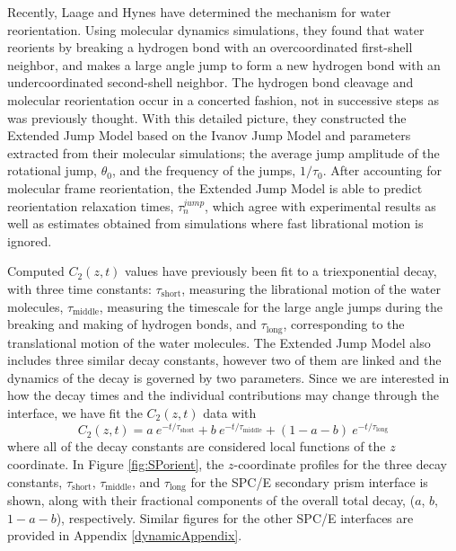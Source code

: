 Recently, Laage and Hynes have determined the mechanism for water
reorientation.\cite{Laage2006,Laage2008} Using molecular dynamics
simulations, they found that water reorients by breaking a hydrogen
bond with an overcoordinated first-shell neighbor, and makes a large
angle jump to form a new hydrogen bond with an undercoordinated
second-shell neighbor. The hydrogen bond cleavage and molecular
reorientation occur in a concerted fashion, not in successive steps as
was previously thought. With this detailed picture, they constructed
the Extended Jump Model\cite{Laage2006,Laage2008} based on the Ivanov
Jump Model and parameters extracted from their molecular simulations;
the average jump amplitude of the rotational jump, $\theta_{0}$, and
the frequency of the jumps, $1/\tau_{0}$. After accounting for
molecular frame reorientation, the Extended Jump Model is able to
predict reorientation relaxation times, $\tau_{n}^{jump}$, which agree
with experimental results as well as estimates obtained from
simulations where fast librational motion is ignored.

Computed $C_2(z,t)$ values have previously been fit to a
triexponential decay, with three time constants:
$\tau_\mathrm{short}$, measuring the librational motion of the water
molecules, $\tau_\mathrm{middle}$, measuring the timescale for the
large angle jumps during the breaking and making of hydrogen bonds,
and $\tau_\mathrm{long}$, corresponding to the translational motion of
the water molecules.\cite{Louden2013a} The Extended Jump Model also
includes three similar decay constants, however two of them are linked
and the dynamics of the decay is governed by two parameters. Since we
are interested in how the decay times and the individual contributions
may change through the interface, we have fit the $C_2(z,t)$ data
with
\begin{equation}
  C_{2}(z,t) = a~e^{-t/\tau_\mathrm{short}} + b~e^{-t/\tau_\mathrm{middle}} + 
  (1-a-b)~e^{-t/\tau_\mathrm{long}}
\label{eq:c2}
\end{equation}
where all of the decay constants are considered local functions of the
$z$ coordinate. In Figure \ref{fig:SPorient}, the $z$-coordinate
profiles for the three decay constants, $\tau_{\mathrm{short}}$,
$\tau_{\mathrm{middle}}$, and $\tau_{\mathrm{long}}$ for the SPC/E
secondary prism interface is shown, along with their fractional
components of the overall total decay, ($a$, $b$, $1-a-b$),
respectively. Similar figures for the other SPC/E interfaces are provided in
Appendix \ref{dynamicAppendix}.

